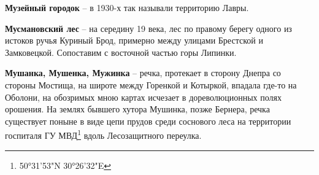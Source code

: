 \textbf{Музейный городок} – в 1930-х так называли территорию Лавры.\\

\medskip

\textbf{Мусмановский лес} – на середину 19 века, лес по правому берегу одного из истоков ручья Куриный Брод, примерно между улицами Брестской и Замковецкой. Сопоставим с восточной частью горы Липинки.\\


\medskip

\textbf{Мушанка, Мушенка, Мужинка} – речка, протекает в сторону Днепра со стороны Мостища, на широте между Горенкой и Котыркой, впадала где-то на Оболони, на обозримых мною картах исчезает в дореволюционных полях орошения. На землях бывшего хутора Мушинка, позже Бернера, речка существует поныне в виде цепи прудов среди соснового леса на территории госпиталя ГУ МВД\footnote{50°31'53"N 30°26'32"E} вдоль Лесозащитного переулка.
